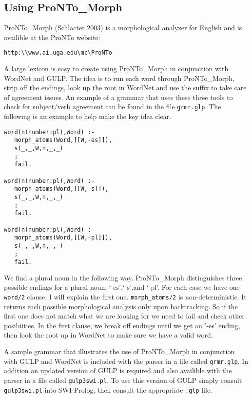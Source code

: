\documentclass[12pt]{article}
\begin{document}
\subsection{Using ProNTo\_Morph}
ProNTo\_Morph (Schlacter 2003) is a morphological analyzer for English and is availible at the ProNTo website:

\begin{verbatim}
http:\\www.ai.uga.edu\mc\ProNTo
\end{verbatim}


A large lexicon is easy to create using ProNTo\_Morph in conjunction with WordNet and GULP.  The idea is to run each word through ProNTo\_Morph, strip off the endings, look up the root in WordNet and use the suffix to take care of agreement issues. An example of a grammar that uses these three tools to check for subject/verb agreement can be found in the file \verb|grmr.glp|.  The following is an example to help make the key idea clear.

\begin{verbatim}
word(n(number:pl),Word) :-
   morph_atoms(Word,[[W,-es]]),
   s(_,_,W,n,_,_)
   ;
   fail.

word(n(number:pl),Word) :-
   morph_atoms(Word,[[W,-s]]),
   s(_,_,W,n,_,_)
   ;
   fail.

word(n(number:pl),Word) :-
   morph_atoms(Word,[[W,-pl]]),
   s(_,_,W,n,_,_)
   ;
   fail.
\end{verbatim}

We find a plural noun in the following way.  ProNTo\_Morph distinguishes three possible endings for a plural noun: `-es',`-s',and `-pl'.  For each case we have one \verb|word/2| clause.  I will explain the first one.  \verb|morph_atoms/2| is non-deterministic.  It returns each possible morphological analysis only upon backtracking. So if the first one does not match what we are looking for we need to fail and check other posibiities.  In the first clause, we break off endings until we get an '-es' ending, then look the root up in WordNet to make sure we have a valid word.

A sample grammar that illustrates the use of ProNTo\_Morph in conjunction with GULP and WordNet is included with the parser in a file called \verb|grmr.glp|. In addition an updated version of GULP is required and also availible with the parser in a file called \verb|gulp3swi.pl|. To use this version of GULP simply consult \verb|gulp3swi.pl| into SWI-Prolog, then consult the appropriate \verb|.glp| file.
\end{document}
